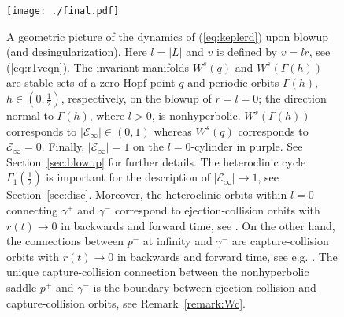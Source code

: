 \documentclass[reqno,12pt]{amsart}
\newcommand{\secref}[1]{Section~\ref{sec:#1}}
\renewcommand{\eqref}[1]{(\ref{eq:#1})}
\newcommand{\figlab}[1]{\label{fig:#1}}
\newcommand{\remref}[1]{Remark~\ref{remark:#1}}
\numberwithin{equation}{section}
\begin{document}
\begin{figure}[h!]
 	\begin{center}
 		{\texttt{[image: ./final.pdf]}}
 		\caption{A geometric picture of the dynamics of \eqref{keplerd} upon blowup (and desingularization). Here $l=\vert L\vert$ and $v$ is defined by $v=l\dot r$, see \eqref{r1veqn}. The invariant manifolds $W^s(q)$ and $W^s(\Gamma(h))$ are stable sets of a zero-Hopf point $q$ and periodic orbits $\Gamma(h)$, $h\in (0,\frac12)$, respectively, on the blowup of $r=l=0$; the direction normal to $\Gamma(h)$, where $l>0$, is nonhyperbolic.  $W^s(\Gamma(h))$ corresponds to $\vert \mathcal E_\infty\vert \in (0,1)$ whereas $W^s(q)$ corresponds to $\mathcal E_\infty =0 $. Finally, $\vert \mathcal E_\infty\vert=1$ on the $l=0$-cylinder in purple. See \secref{blowup} for further details. The heteroclinic cycle $\Gamma_1\!\left(\frac12\right)$ is important for the description of $\vert \mathcal E_\infty\vert\rightarrow 1$, see \secref{disc}. Moreover, the heteroclinic orbits within $l=0$ connecting $\gamma^+$ and $\gamma^-$ correspond to ejection-collision orbits with $r(t)\rightarrow 0$ in backwards and forward time, see \cite{margheri2014a}. On the other hand, the connections between $p^-$ at infinity and $\gamma^-$ are capture-collision orbits with $r(t)\rightarrow 0$ in backwards and forward time, see e.g. \cite{diacu1999a,margheri2014a}. The unique capture-collision connection between the nonhyperbolic saddle $p^+$ and $\gamma^-$ is the boundary between ejection-collision and capture-collision orbits, see \remref{Wc}. }\figlab{final}
 	\end{center}
 \end{figure}
\end{document}
